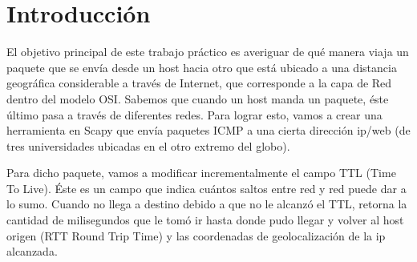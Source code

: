 \section{Introducción}
\PARstart El objetivo principal de este trabajo práctico es averiguar de qué manera viaja un paquete que se envía 
desde un host hacia otro que está ubicado a una distancia geográfica considerable a través de Internet, 
que corresponde a la capa de Red dentro del modelo OSI.
Sabemos que cuando un host manda un paquete, éste último pasa a través de diferentes redes. Para lograr esto, 
vamos a crear una herramienta en Scapy que envía paquetes ICMP a una cierta dirección ip/web (de tres universidades ubicadas en el otro extremo del globo). 

Para dicho paquete, vamos a modificar incrementalmente el campo TTL (Time To Live). Éste es un campo que indica 
cuántos saltos entre red y red puede dar a lo sumo. Cuando no llega a destino debido a que no le alcanzó el TTL, 
retorna la cantidad de milisegundos que le tomó ir hasta donde pudo llegar y volver al host origen (RTT Round Trip Time)
y las coordenadas de geolocalización de la ip alcanzada.
